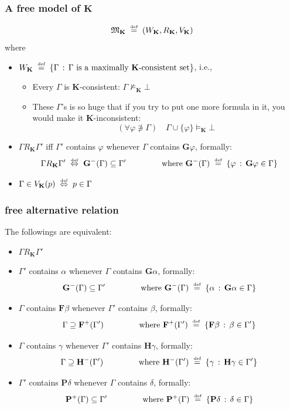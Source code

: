 \documentclass[xcolor=x11names]{beamer}
\newcommand{\FD}{\mathbf F}
\newcommand{\FB}{\mathbf G}
\newcommand{\PD}{\mathbf P}
\newcommand{\PB}{\mathbf H}
\newcommand{\defegy}[1][.1]{\hspace{#1cm}\overset{\textup{\tiny def}}{=}\hspace{#1cm}}
\newcommand{\defekv}[1][.1]{\hspace{#1cm}\overset{\textup{\tiny def}}{ \Leftrightarrow }\hspace{#1cm}}
\newcommand{\forallp}[1]{(\forall #1)}
\begin{document}
\begin{frame}
\frametitle{A free model of $\mathbf K$}

\[\mathfrak M_{\mathbf K} \defegy \left( W_{\mathbf K}, R_{\mathbf K}, V_{\mathbf K}\right)   \]
where
\begin{itemize}
\item $W_{\mathbf K} \defegy \{\Gamma \, :\, \textup{$ \Gamma$  is a maximally $\mathbf K$-consistent set} \}$, i.e.,
\begin{itemize}\footnotesize
\item Every $\Gamma$ is $\mathbf K$-consistent: $\Gamma \not \models_{\mathbf K} \bot$
\item These $\Gamma$'s is so huge that if you try to put one more formula in it, you would make it $\mathbf K$-inconsistent:
\[ \forallp {\varphi\not \ni \Gamma} \quad \Gamma \cup \{\varphi \}\models_{\mathbf K}\bot\]
\end{itemize}
\item $\Gamma R_{\mathbf K}\Gamma'$ iff $\Gamma'$ contains $\varphi$ whenever $\Gamma$ contains $\FB \varphi$, formally:
 \[ \Gamma R_{\mathbf K}\Gamma' \defekv \FB^-(\Gamma )\subseteq \Gamma' \qquad \qquad \textup{ where }\FB^-(\Gamma)\defegy \{\varphi \, : \, \FB \varphi \in \Gamma\}\]
\item $\Gamma \in V_{\mathbf K}(p) \defekv p\in \Gamma$
\end{itemize}


\end{frame}



\begin{frame}
\frametitle{free alternative relation}
The followings are equivalent:

\begin{itemize}
\item $\Gamma R_{\mathbf K}\Gamma'$
\item  $\Gamma'$ contains $\alpha$ whenever $\Gamma$ contains $\FB \alpha$, formally:
 \[ \FB^-(\Gamma )\subseteq \Gamma' \qquad \qquad \textup{ where }\FB^-(\Gamma)\defegy \{\alpha \, : \, \FB \alpha \in \Gamma\}\]
\item  $\Gamma$ contains $\FD\beta$ whenever $\Gamma'$ contains $\beta$, formally:
 \[ \Gamma \supseteq \FD^+(\Gamma') \qquad \qquad \textup{ where }\FD^+(\Gamma')\defegy \{\FD \beta \, : \, \beta \in \Gamma'\}\]
\item  $\Gamma$ contains $\gamma$ whenever $\Gamma'$ contains $\PB \gamma$, formally:
 \[ \Gamma \supseteq \PB^-(\Gamma') \qquad \qquad \textup{ where }\PB^-(\Gamma')\defegy \{\gamma \, : \, \PB \gamma \in \Gamma'\}\]
\item  $\Gamma'$ contains $\PD\delta$ whenever $\Gamma$ contains $\delta$, formally:
 \[  \PD^+(\Gamma)\subseteq \Gamma' \qquad \qquad \textup{ where }\PD^+(\Gamma)\defegy \{\PD \delta \, : \, \delta \in \Gamma\}\]
\end{itemize}


\end{frame}
\end{document}
